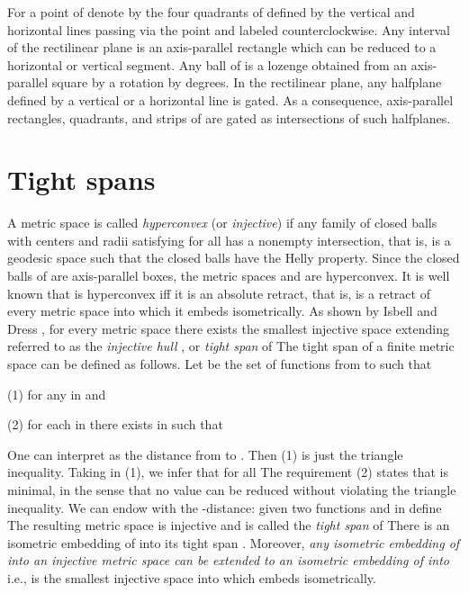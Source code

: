 \documentclass[11pt]{amsart}
\begin{document}
For a point  of  denote by  the
four quadrants of  defined by the vertical and horizontal
lines passing via the point  and labeled counterclockwise.
Any interval  of the rectilinear plane  is an
axis-parallel rectangle which can be
reduced to a horizontal or vertical segment. Any ball of  is a lozenge obtained from an axis-parallel square by a
rotation by  degrees. In the rectilinear plane, any halfplane defined
by a vertical or a horizontal line is gated. As a consequence,
axis-parallel rectangles, quadrants, and strips of   are gated as intersections of such halfplanes.




\section{Tight spans}

A metric space  is called {\it hyperconvex} (or {\it
injective})  \cite{ArPa,Is} if any family of closed balls
 with centers  and radii  
satisfying  for all  has a nonempty
intersection, that is,  is a geodesic space such that the
closed balls have the Helly property. Since the closed
balls of  are axis-parallel boxes, the
metric spaces  and 
are hyperconvex. It is well known \cite{ArPa} that  is
hyperconvex iff it is an absolute retract, that is,
 is a retract of every metric space into which it embeds
isometrically.  As shown by Isbell \cite{Is} and Dress \cite{Dr},
for every metric space  there exists the smallest injective
space  extending  referred to as the {\it injective
hull} \cite{Is}, or {\it tight span} \cite{Dr} of  The tight
span of a finite metric space  can be defined as follows. Let
 be the set of functions  from  to  such
that

\medskip
(1) for any  in   and

(2) for each  in  there exists  in  such that 

\medskip
One can interpret  as the distance from  to . Then (1)
is just the triangle inequality.  Taking  in (1), we infer that
 for all   The requirement (2) states that
 is minimal, in the sense that no value  can be reduced
without violating the triangle inequality. We can endow  with
the -distance: given two functions  and  in
 define  The resulting metric
space  is injective and  is called the
{\it tight span} of  There is an isometric embedding of 
into its tight span . Moreover, {\it any isometric embedding
of  into an injective metric space  can be extended
to an isometric embedding of  into } i.e.,
 is the smallest injective space into which  embeds isometrically. 
\end{document}
